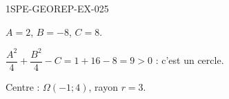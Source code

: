 \begin{corrige}{1SPE-GEOREP-EX-025}

$A = 2$, $B = -8$, $C = 8$.

$\dfrac{A^2}{4} + \dfrac{B^2}{4} - C = 1 + 16 - 8 = 9 > 0$ : c'est un cercle.

Centre : $\Omega(-1 ; 4)$, rayon $r = 3$.

\end{corrige}
